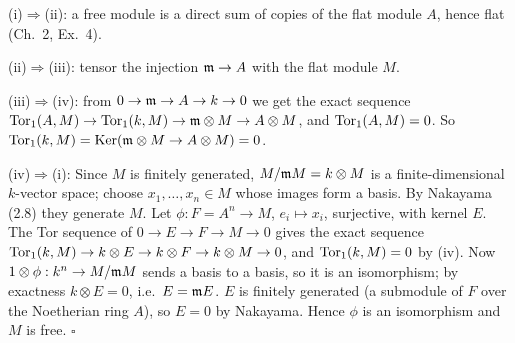\documentclass[11pt]{article}
\begin{document}
\pf
(i)$\Rightarrow$(ii): a free module is a direct sum of copies of the flat module $A$, hence flat (Ch.~2, Ex.~4).

(ii)$\Rightarrow$(iii): tensor the injection $\mathfrak m\to A$ with the flat module $M$.

(iii)$\Rightarrow$(iv): from $0\to\mathfrak m\to A\to k\to0$ we get the exact sequence $\operatorname{Tor}_1(A,M)\to\operatorname{Tor}_1(k,M)\to\mathfrak m\otimes M\to A\otimes M$, and $\operatorname{Tor}_1(A,M)=0$. So $\operatorname{Tor}_1(k,M)=\operatorname{Ker}(\mathfrak m\otimes M\to A\otimes M)=0$.

(iv)$\Rightarrow$(i): Since $M$ is finitely generated, $M/\mathfrak m M=k\otimes M$ is a finite-dimensional $k$-vector space; choose $x_1,\dots,x_n\in M$ whose images form a basis. By Nakayama (2.8) they generate $M$. Let $\phi:F=A^n\to M$, $e_i\mapsto x_i$, surjective, with kernel $E$. The Tor sequence of $0\to E\to F\to M\to0$ gives the exact sequence $\operatorname{Tor}_1(k,M)\to k\otimes E\to k\otimes F\to k\otimes M\to0$, and $\operatorname{Tor}_1(k,M)=0$ by (iv). Now $1\otimes\phi:k^n\to M/\mathfrak m M$ sends a basis to a basis, so it is an isomorphism; by exactness $k\otimes E=0$, i.e.\ $E=\mathfrak m E$. $E$ is finitely generated (a submodule of $F$ over the Noetherian ring $A$), so $E=0$ by Nakayama. Hence $\phi$ is an isomorphism and $M$ is free. \hfill$\square$
\end{document}
